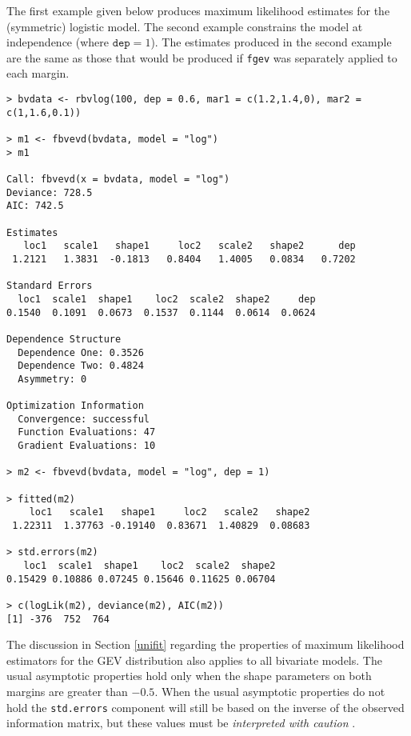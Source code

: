\documentclass[11pt,a4paper]{article}
\begin{document}
The first example given below produces maximum likelihood estimates for the (symmetric) logistic model.
The second example constrains the model at independence (where $\texttt{dep} = 1$).
The estimates produced in the second example are the same as those that would be produced if \verb+fgev+ was separately applied to each margin. 

\begin{verbatim}
> bvdata <- rbvlog(100, dep = 0.6, mar1 = c(1.2,1.4,0), mar2 = c(1,1.6,0.1))

> m1 <- fbvevd(bvdata, model = "log")
> m1

Call: fbvevd(x = bvdata, model = "log") 
Deviance: 728.5 
AIC: 742.5 

Estimates
   loc1   scale1   shape1     loc2   scale2   shape2      dep  
 1.2121   1.3831  -0.1813   0.8404   1.4005   0.0834   0.7202  

Standard Errors
  loc1  scale1  shape1    loc2  scale2  shape2     dep  
0.1540  0.1091  0.0673  0.1537  0.1144  0.0614  0.0624  

Dependence Structure
  Dependence One: 0.3526 
  Dependence Two: 0.4824 
  Asymmetry: 0 

Optimization Information
  Convergence: successful 
  Function Evaluations: 47 
  Gradient Evaluations: 10

> m2 <- fbvevd(bvdata, model = "log", dep = 1)

> fitted(m2)
    loc1   scale1   shape1     loc2   scale2   shape2 
 1.22311  1.37763 -0.19140  0.83671  1.40829  0.08683

> std.errors(m2)
   loc1  scale1  shape1    loc2  scale2  shape2 
0.15429 0.10886 0.07245 0.15646 0.11625 0.06704

> c(logLik(m2), deviance(m2), AIC(m2))
[1] -376  752  764
\end{verbatim}

The discussion in Section \ref{unifit} regarding the properties of maximum likelihood estimators for the GEV distribution also applies to all bivariate models.
The usual asymptotic properties hold only when the shape parameters on both margins are greater than $-0.5$.
When the usual asymptotic properties do not hold the \verb+std.errors+ component will still be based on the inverse of the observed information matrix, but these values must be \emph{interpreted with caution} \citep{smit85}.
\end{document}
